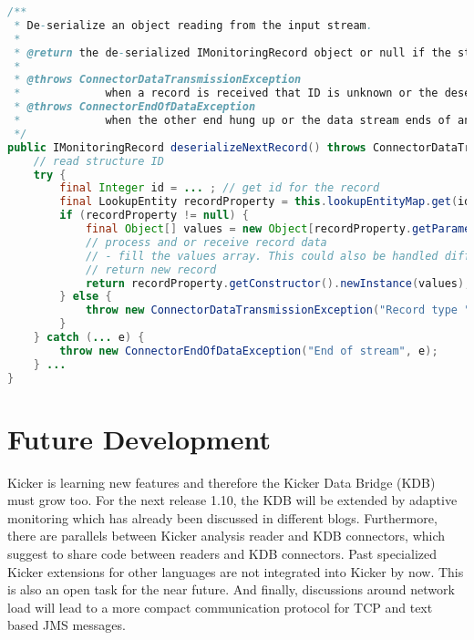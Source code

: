 \documentclass[11pt,a4paper]{article}
\begin{document}
\begin{lstlisting}[language=Java,caption=De-serialization method example]
/**
 * De-serialize an object reading from the input stream.
 * 
 * @return the de-serialized IMonitoringRecord object or null if the stream was terminated by the client.
 * 
 * @throws ConnectorDataTransmissionException
 *             when a record is received that ID is unknown or the deserialization fails
 * @throws ConnectorEndOfDataException
 *             when the other end hung up or the data stream ends of another reason
 */
public IMonitoringRecord deserializeNextRecord() throws ConnectorDataTransmissionException, ConnectorEndOfDataException {
	// read structure ID
	try {
		final Integer id = ... ; // get id for the record
		final LookupEntity recordProperty = this.lookupEntityMap.get(id);
		if (recordProperty != null) {
			final Object[] values = new Object[recordProperty.getParameterTypes).length];
			// process and or receive record data
			// - fill the values array. This could also be handled differently.
			// return new record
			return recordProperty.getConstructor().newInstance(values);
		} else {
			throw new ConnectorDataTransmissionException("Record type " + id + " is not registered.");
		}
	} catch (... e) {
		throw new ConnectorEndOfDataException("End of stream", e);
	} ...
}
\end{lstlisting}


\section{Future Development}\label{s:outlook}

Kicker is learning new features and therefore the Kicker Data Bridge (KDB) must grow too. For the next release 1.10, the KDB will be extended by adaptive monitoring which has already been discussed in different blogs. Furthermore, there are parallels between Kicker analysis reader and KDB connectors, which suggest to share code between readers and KDB connectors. Past specialized Kicker extensions for other languages are not integrated into Kicker by now. This is also an open task for the near future. And finally, discussions around network load will lead to a more compact communication protocol for TCP and text based JMS messages.
\end{document}
